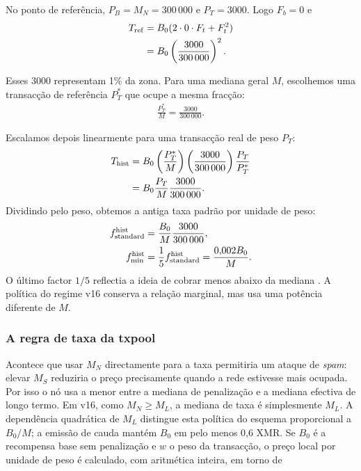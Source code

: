 No ponto de referência, $P_B=M_N=300\,000$ e $P_T=3000$. Logo $F_b=0$ e
\begin{align*}
T_{\rm ref} &= B_0(2\cdot0\cdot F_t+F_t^2)\\
             &= B_0\left(\frac{3000}{300\,000}\right)^2.
\end{align*}

Esses 3000 representam 1\% da zona. Para uma mediana geral $M$, escolhemos
uma transacção de referência $P_T^*$ que ocupe a mesma fracção:
\begin{align*}
\frac{P_T^*}{M}=\frac{3000}{300\,000}.
\end{align*}

Escalamos depois linearmente para uma transacção real de peso $P_T$:
\begin{align*}
T_{\rm hist}
 &=B_0\left(\frac{P_T^*}{M}\right)
       \left(\frac{3000}{300\,000}\right)\frac{P_T}{P_T^*}\\
 &=B_0\frac{P_T}{M}\frac{3000}{300\,000}.
\end{align*}
Dividindo pelo peso, obtemos a antiga taxa padrão por unidade de peso:
\begin{align*}
f_{\rm standard}^{\rm hist}&=\frac{B_0}{M}\frac{3000}{300\,000},\\
f_{\min}^{\rm hist}&=\frac15 f_{\rm standard}^{\rm hist}
                   =\frac{0{,}002B_0}{M}.
\end{align*}
O último factor $1/5$ reflectia a ideia de cobrar menos abaixo da mediana
\cite{jollymore-old-analysis}. A política do regime v16 conserva a relação marginal,
mas usa uma potência diferente de $M$.

\subsubsection*{A regra de taxa da txpool}

Acontece que usar $M_N$ directamente para a taxa permitiria um ataque de
{\em spam}: elevar $M_S$ reduziria o preço precisamente quando a rede estivesse
mais ocupada. Por isso o nó usa a menor entre a mediana de penalização e a
mediana efectiva de longo termo. Em v16, como $M_N\geq M_L$, a mediana de taxa
é simplesmente $M_L$. A dependência quadrática de $M_L$ distingue esta
política do esquema proporcional a $B_0/M$; a emissão de cauda mantém $B_0$
em pelo menos 0,6 XMR.
%
Se $B_0$ é a recompensa base sem penalização e $w$ o peso da transacção, o
preço local por unidade de peso é calculado, com aritmética inteira, em torno de


